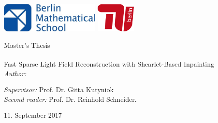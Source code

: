 \documentclass[11pt, english, singlespacing, headsepline, ]{MastersDoctoralThesis}
\author{Héctor Andrade Loarca} %
\theoremstyle{definition}
\begin{document}
\frontmatter %

\pagestyle{plain} %


\begin{titlepage}
\centering\includegraphics*[width=5cm]{bms-logo.jpg} \vspace{50pt}\includegraphics*[width=2cm]{tu-logo.jpg} \\

\begin{center}

{\LARGE \univname\par}\vspace{1.5cm} %
\Large Master's Thesis\\[0.5cm] %

\HRule \\[0.4cm] %
\huge
Fast Sparse Light Field Reconstruction with Shearlet-Based Inpainting
\vspace{0.4cm} %
\HRule \\[1.5cm] %
 \normalsize
\emph{Author:}\\
{\authorname} %


\vspace{4cm}

\begin{flushleft} 
\emph{Supervisor:} Prof. Dr. Gitta Kutyniok\\
\emph{Second reader:} Prof. Dr. Reinhold Schneider.\\
\end{flushleft} 


\vspace{1cm}
 \facname

{\large 11. September 2017}\\[4cm] %
 
\vfill
\end{center}
\end{titlepage}
\end{document}

